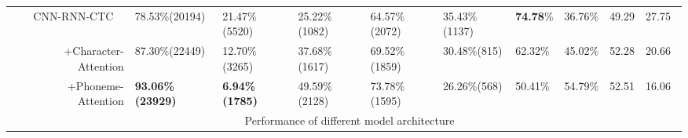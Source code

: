 \documentclass[a4paper]{article}
\begin{document}
\begin{table}[]
{\begin{tabular}{l|r|l|l|l|l|l|l|c|c|l|}
 & \multicolumn{1}{c|}{CNN-RNN-CTC\cite{leung2019cnn}}             & 78.53\%(20194)                                                                              & 21.47\%(5520)                                                                                   & 25.22\%(1082)                                                                                 & 64.57\%(2072)                                                                  & 35.43\%(1137)                                                               & \textbf{74.78}\%                       & 36.76\%                          & 49.29                   & 27.75                \\ \cline{2-11} 
 & +Character-Attention                                   & 87.30\%(22449)                                                                              & 12.70\%(3265)                                                                                   & 37.68\%(1617)                                                                                 & 69.52\%(1859)                                                                  & 30.48\%(815)                                                                & 62.32\%                       & 45.02\%                          & 52.28                   & 20.66\                    \\ \cline{2-11}
 & +Phoneme-Attention                                   & \textbf{93.06\%(23929)}                                                                              & \textbf{6.94\%(1785)}                                                                                   & 49.59\%(2128)                                                                                 & 73.78\%(1595)                                                                  & 26.26\%(568)                                                                & 50.41\%                       & 54.79\%                          & 52.51                   & 16.06\                   \\ \cline{2-11} 
 & \multicolumn{10}{c|}{Performance of  different model architecture}                                                                                                                                                                                                                                                                                                                                                                                                                                                                                                                                              \\ \cline{2-11} 

\end{tabular}}
\end{table}
\end{document}
